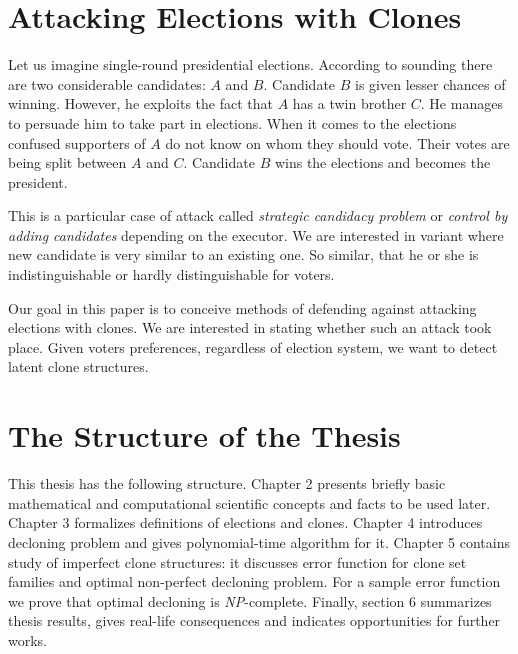 



\section{Attacking Elections with Clones}


Let us imagine single-round presidential elections.
According to sounding there are two considerable candidates: $A$ and $B$.
Candidate $B$ is given lesser chances of winning.
However, he exploits the fact that $A$ has a twin brother $C$.
He manages to persuade him to take part in elections.
When it comes to the elections confused supporters of $A$ do not know on whom they should vote.
Their votes are being split between $A$ and $C$.
Candidate $B$ wins the elections and becomes the president.

This is a particular case of attack called \textit{strategic candidacy problem} or \textit{control by adding candidates}
depending on the executor.
We are interested in variant where new candidate is very similar to an existing one.
So similar, that he or she is indistinguishable or hardly distinguishable for voters.

Our goal in this paper is to conceive methods of defending against attacking elections with clones.
We are interested in stating whether such an attack took place.
Given voters preferences, regardless of election system, we want to detect latent clone structures.



\section{The Structure of the Thesis}


This thesis has the following structure.
Chapter 2 presents briefly basic mathematical and computational scientific concepts and facts to be used later.
Chapter 3 formalizes definitions of elections and clones.
Chapter 4 introduces decloning problem and gives polynomial-time algorithm for it.
Chapter 5 contains study of imperfect clone structures:
it discusses error function for clone set families and optimal non-perfect decloning problem.
For a sample error function we prove that optimal decloning is \textit{NP}-complete.
Finally, section 6 summarizes thesis results, gives real-life consequences and indicates opportunities for further works.